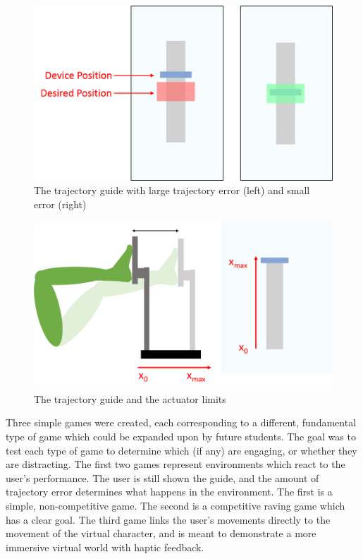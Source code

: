\documentclass[12pt]{report}
\begin{document}
	\begin{figure}[h] 
		\centering
		\includegraphics[width=0.75\linewidth]{UI_trajectory}
		\caption{The trajectory guide with large trajectory error (left) and small error (right)}
		\label{fig:trajectory}
	\end{figure} 
	
	\begin{figure}[h] 
		\centering
		\includegraphics[width=\linewidth]{axis_leg}
		\caption{The trajectory guide and the actuator limits}
		\label{fig:axis_leg}
	\end{figure} 
	

	
	Three simple games were created, each corresponding to a different, fundamental type of game which could be expanded upon by future students. The goal was to test each type of game to determine which (if any) are engaging, or whether they are distracting. The first two games represent environments which react to the user's performance. The user is still shown the guide, and the amount of trajectory error determines what happens in the environment. The first is a simple, non-competitive game. The second is a competitive raving game which has a clear goal. The third game links the user's movements directly to the movement of the virtual character, and is meant to demonstrate a more immersive virtual world with haptic feedback. 
	
\end{document}
